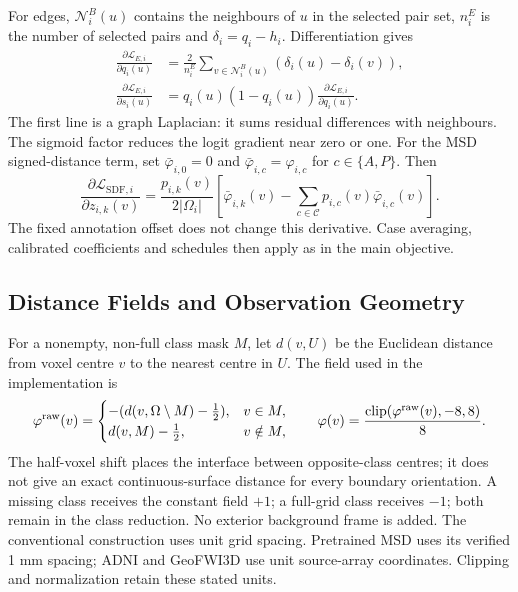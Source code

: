\documentclass[12pt,a4paper]{article}
\begin{document}
For edges, $\mathcal N_i^B(u)$ contains the neighbours of $u$ in the
selected pair set, $n_i^E$ is the number of selected pairs and
$\delta_i=q_i-h_i$. Differentiation gives
\begin{equation}
\begin{aligned}
\frac{\partial\mathcal L_{E,i}}{\partial q_i(u)}
 &=\frac{2}{n_i^E}\sum_{v\in\mathcal N_i^B(u)}
     (\delta_i(u)-\delta_i(v)),\\
\frac{\partial\mathcal L_{E,i}}{\partial s_i(u)}
 &=q_i(u)(1-q_i(u))\frac{\partial\mathcal L_{E,i}}{\partial q_i(u)}.
\end{aligned}\label{eq:edge-logit-gradient}
\end{equation}
The first line is a graph Laplacian: it sums residual differences with
neighbours. The sigmoid factor reduces the logit gradient near zero or
one. For the MSD signed-distance term, set $\bar\varphi_{i,0}=0$ and
$\bar\varphi_{i,c}=\varphi_{i,c}$ for $c\in\{A,P\}$. Then
\begin{equation}
\frac{\partial\mathcal L_{\mathrm{SDF},i}}{\partial z_{i,k}(v)}
=\frac{p_{i,k}(v)}{2|\Omega_i|}
 \left[\bar\varphi_{i,k}(v)-\sum_{c\in\mathcal C}
 p_{i,c}(v)\bar\varphi_{i,c}(v)\right].
\label{eq:sdf-logit-gradient}
\end{equation}
The fixed annotation offset does not change this derivative. Case
averaging, calibrated coefficients and schedules then apply as in the
main objective.

\subsection{Distance Fields and Observation Geometry}
\label{sec:sdf-construction-details}

For a nonempty, non-full class mask $M$, let $d(v,U)$ be the Euclidean
distance from voxel centre $v$ to the nearest centre in $U$. The field
used in the implementation is
\begin{equation}
\varphi^{\rm raw}(v)=
\begin{cases}
-(d(v,\Omega\setminus M)-\tfrac12), & v\in M,\\
d(v,M)-\tfrac12, & v\notin M,
\end{cases}
\qquad
\varphi(v)=\frac{\operatorname{clip}(\varphi^{\rm raw}(v),-8,8)}{8}.
\label{eq:sdf-half-voxel-field}
\end{equation}
The half-voxel shift places the interface between opposite-class
centres; it does not give an exact continuous-surface distance for every
boundary orientation. A missing class receives the constant field $+1$;
a full-grid class receives $-1$; both remain in the class reduction.
No exterior background frame is added. The conventional construction uses unit grid
spacing. Pretrained MSD uses its verified 1 mm spacing; ADNI and
GeoFWI3D use unit source-array coordinates. Clipping and normalization
retain these stated units.
\end{document}
